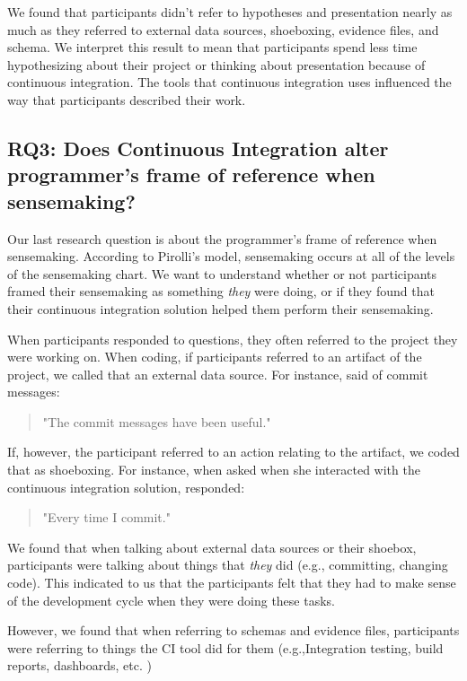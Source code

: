 \documentclass{sig-alternate}
\begin{document}
We found that participants didn't refer to hypotheses and presentation nearly as much as they referred to external data sources, shoeboxing, evidence files, and schema. We interpret this result to mean that participants spend less time hypothesizing about their project or thinking about presentation because of continuous integration. The tools that continuous integration uses influenced the way that participants described their work.

\subsection{RQ3: Does Continuous Integration alter programmer's frame of reference when sensemaking?}
Our last research question is about the programmer's frame of reference when sensemaking. According to Pirolli's model, sensemaking occurs at all of the levels of the sensemaking chart. We want to understand whether or not participants framed their sensemaking as something \textit{they} were doing, or if they found that their continuous integration solution helped them perform their sensemaking.

When participants responded to questions, they often referred to the project they were working on. When coding, if participants referred to an artifact of the project, we called that an external data source. For instance, \srutitwo  said of commit messages: 

\begin{quote}
"The commit messages have been  useful."
\end{quote}


If, however, the participant referred to an action relating to the artifact, we coded that as shoeboxing. For instance, when asked when she interacted with the continuous integration solution, \srutitwo responded: 

\begin{quote}
"Every time I commit."	
\end{quote}


We found that when talking about external data sources  or their shoebox, participants were talking about things that \textit{they} did (e.g., committing, changing code). This indicated to us that the participants felt that they had to make sense of the development cycle when they were doing these tasks. 

However, we found that when referring to schemas and evidence files, participants were referring to things the CI tool did for them (e.g.,Integration testing, build reports, dashboards, etc.
) 
\end{document}
